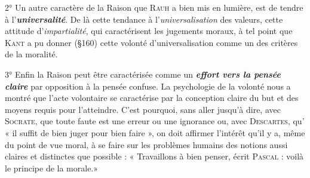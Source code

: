 2° Un autre caractère de la Raison que \textsc{Rauh} a bien mis en lumière,
est de tendre à l’\textbf{\textit {universalité}}. De là cette tendance à l’{\it universalisation}
des valeurs, cette attitude d’{\it impartialité}, qui caractérisent les
jugements moraux, à tel point que \textsc{Kant} a pu donner (\S 160) cette
volonté d’universalisation comme un des critères de la moralité.

3° Enfin la Raison peut être caractérisée comme un \textbf{\textit {effort vers la
pensée claire}} par opposition à la pensée confuse. La psychologie
de la volonté nous a montré que l’acte volontaire se caractérise par
la conception claire du but et des moyens requis pour l’atteindre.
C’est pourquoi, sans aller jusqu’à dire, avec \textsc{Socrate}, que toute faute
est une erreur ou une ignorance ou, avec \textsc{Descartes}, qu’ « il suffit de
bien juger pour bien faire », on doit affirmer l’intérêt qu’il y a, même
du point de vue moral, à se faire sur les problèmes humains des
notions aussi claires et distinctes que possible : « Travaillons à bien
penser, écrit \textsc{Pascal} : voilà le principe de la morale.»

